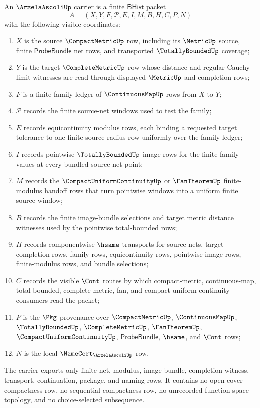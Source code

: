 \begin{definition}
\label{def:arzela-ascoli-carrier}
An $\ArzelaAscoliUp$ carrier is a finite $\mathsf{BHist}$ packet
$$
A=(X,Y,F,\mathcal{P},E,I,M,B,H,C,P,N)
$$
with the following visible coordinates:
\begin{enumerate}
\item $X$ is the source $\CompactMetricUp$ row, including its $\MetricUp$ source, finite $\mathsf{ProbeBundle}$ net rows, and transported $\TotallyBoundedUp$ coverage;
\item $Y$ is the target $\CompleteMetricUp$ row whose distance and regular-Cauchy limit witnesses are read through displayed $\MetricUp$ and completion rows;
\item $F$ is a finite family ledger of $\ContinuousMapUp$ rows from $X$ to $Y$;
\item $\mathcal{P}$ records the finite source-net windows used to test the family;
\item $E$ records equicontinuity modulus rows, each binding a requested target tolerance to one finite source-radius row uniformly over the family ledger;
\item $I$ records pointwise $\TotallyBoundedUp$ image rows for the finite family values at every bundled source-net point;
\item $M$ records the $\CompactUniformContinuityUp$ or $\FanTheoremUp$ finite-modulus handoff rows that turn pointwise windows into a uniform finite source window;
\item $B$ records the finite image-bundle selections and target metric distance witnesses used by the pointwise total-bounded rows;
\item $H$ records componentwise $\hsame$ transports for source nets, target-completion rows, family rows, equicontinuity rows, pointwise image rows, finite-modulus rows, and bundle selections;
\item $C$ records the visible $\Cont$ routes by which compact-metric, continuous-map, total-bounded, complete-metric, fan, and compact-uniform-continuity consumers read the packet;
\item $P$ is the $\Pkg$ provenance over $\CompactMetricUp$, $\ContinuousMapUp$, $\TotallyBoundedUp$, $\CompleteMetricUp$, $\FanTheoremUp$, $\CompactUniformContinuityUp$, $\mathsf{ProbeBundle}$, $\hsame$, and $\Cont$ rows;
\item $N$ is the local $\NameCert_{\ArzelaAscoliUp}$ row.
\end{enumerate}
The carrier exports only finite net, modulus, image-bundle, completion-witness, transport, continuation, package, and naming rows. It contains no open-cover compactness row, no sequential compactness row, no unrecorded function-space topology, and no choice-selected subsequence.
\end{definition}

